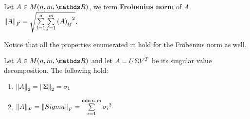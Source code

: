 \documentclass[computationalMathematics.tex]{subfiles}
\begin{document}
\begin{definition}
  Let $A \in M(n, m, \R)$, we term \textbf{Frobenius norm} of $A$ ${\left\lVert A\right\rVert}_F = \sqrt{\sum\limits_{i=1}^n \sum\limits_{j=1}^m {{(A)}_{ij}}^2}$.
\end{definition}

Notice that all the properties enumerated in  hold for the Frobenius norm as well.

\begin{proposition}
  Let $A \in M(n, m, \R)$ and let $A = U \Sigma {V}^{T}$ be its singular value decomposition.
  The following hold:
  \begin{enumerate}
    \item $\left\lVert A\right\rVert_2 = \left\lVert\Sigma\right\rVert_2 = \sigma_1$
    \item $\left\lVert A\right\rVert_F = \left\lVert Sigma\right\rVert_F = \sum\limits_{i=1}^{\min{n, m}} {\sigma_i}^2$
  \end{enumerate}
\end{proposition}
\end{document}
